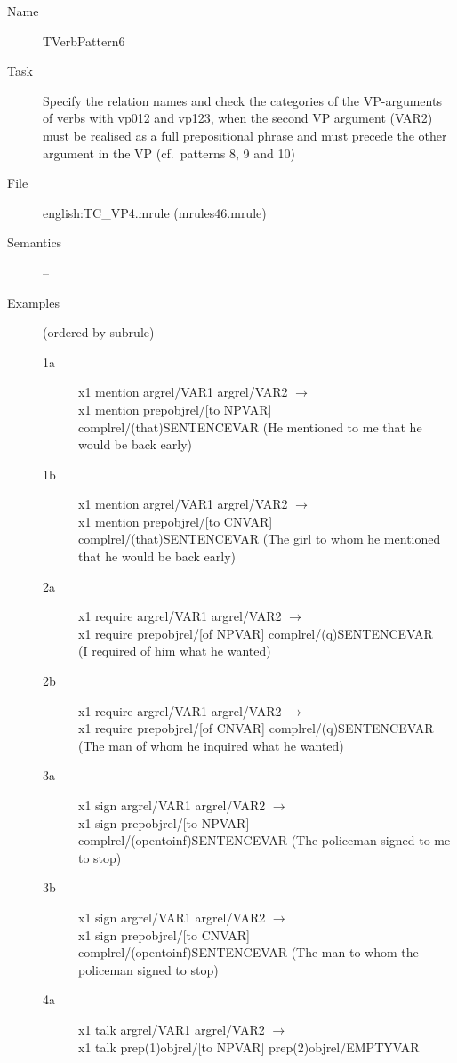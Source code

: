 \begin{description}
\vspace{1 cm}
\begin{description}
\item[Name] TVerbPattern6
\item[Task] Specify the relation names and check the categories of the VP-arguments 
of verbs with vp012 and vp123, when the second VP argument (VAR2) must be realised 
as a full prepositional 
phrase and must precede the other argument in the VP (cf.\ patterns 8, 9 and 10)
\item[File] english:TC\_VP4.mrule (mrules46.mrule)
\item[Semantics] --
\item[Examples] (ordered by subrule)
  \begin{description}
  \item[1a] x1 mention argrel/VAR1 argrel/VAR2 $\rightarrow$ \\
x1 mention     prepobjrel/[to NPVAR] complrel/(that)SENTENCEVAR
(He mentioned to me that he would be back early)
  \item[1b] x1 mention argrel/VAR1 argrel/VAR2 $\rightarrow$ \\
x1 mention     prepobjrel/[to CNVAR] complrel/(that)SENTENCEVAR 
(The girl to whom he mentioned that he would be back early)
  \item[2a] x1 require argrel/VAR1 argrel/VAR2 $\rightarrow$ \\
x1 require    prepobjrel/[of NPVAR] complrel/(q)SENTENCEVAR \\
(I required of him what he wanted)
  \item[2b] x1 require argrel/VAR1 argrel/VAR2 $\rightarrow$ \\
x1 require    prepobjrel/[of CNVAR] complrel/(q)SENTENCEVAR \\
(The man of whom he inquired what he wanted)
  \item[3a] x1 sign argrel/VAR1 argrel/VAR2 $\rightarrow$ \\
x1 sign    prepobjrel/[to NPVAR] complrel/(opentoinf)SENTENCEVAR
(The policeman signed to me to stop)
  \item[3b] x1 sign argrel/VAR1 argrel/VAR2 $\rightarrow$ \\
x1 sign    prepobjrel/[to CNVAR] complrel/(opentoinf)SENTENCEVAR
(The man to whom the policeman signed to stop)
  \item[4a] x1 talk argrel/VAR1 argrel/VAR2 $\rightarrow$ \\
x1 talk    prep(1)objrel/[to NPVAR] prep(2)objrel/EMPTYVAR \\

\end{description}
\end{description}
\end{description}
